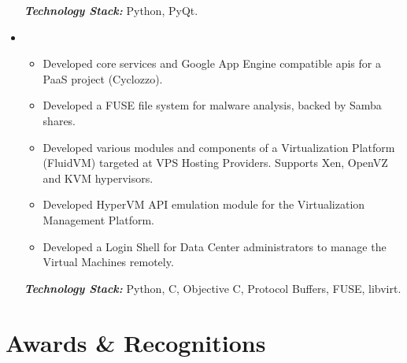 \documentclass[11pt,a4paper,roman]{moderncv}        %
\begin{document}
\begin{itemize}
{\vspace{5pt}

\textit{\textbf{Technology Stack:}} Python, PyQt.

}

\vspace{6pt}

\item{

\begin{itemize}
\item Developed core services and Google App Engine compatible apis for a PaaS project (Cyclozzo).
\item Developed a FUSE file system for malware analysis, backed by Samba shares.
\item Developed various modules and components of a Virtualization Platform (FluidVM) targeted at VPS Hosting Providers. Supports Xen, OpenVZ and KVM hypervisors.
\item Developed HyperVM API emulation module for the Virtualization Management Platform.
\item Developed a Login Shell for Data Center administrators to manage the Virtual Machines remotely.
\end{itemize}

\vspace{5pt}

\textit{\textbf{Technology Stack:}} Python, C, Objective C, Protocol Buffers, FUSE, libvirt.

}

\vspace{6pt}

\end{itemize}

\section{Awards \& Recognitions}

\vspace{6pt}
\end{document}

